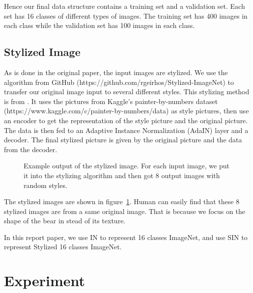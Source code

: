 \documentclass{article} %
\begin{document}
Hence our final data structure contains a training set and a validation set. Each set has 16 classes of different types of images. The training set has 400 images in each class while the validation set has 100 images in each class.

\subsection{Stylized Image}

As is done in the original paper, the input images are stylized. We use the algorithm from GitHub (https://github.com/rgeirhos/Stylized-ImageNet) to transfer our original image input to several different styles. This stylizing method is from \cite{huang2017arbitrary}. It uses the pictures from  Kaggle's painter-by-numbers dataset (https://www.kaggle.com/c/painter-by-numbers/data) as style pictures, then use an encoder to get the representation of the style picture and the original picture. The data is then fed to an Adaptive Instance Normalization (AdaIN) layer and a decoder. The final stylized picture is given by the original picture and the data from the decoder.

\begin{figure}[!h]
\caption{Example output of the stylized image. For each input image, we put it into the stylizing algorithm and then got 8 output images with random styles.}
\label{bear}
\end{figure}

The stylized images are shown in figure~\ref{bear}. Human can easily find that these 8 stylized images are from a same original image. That is because we focus on the shape of the bear in stead of its texture. 

In this report paper, we use IN to represent 16 classes ImageNet, and use SIN to represent Stylized 16 classes ImageNet.

\section{Experiment}
\end{document}
